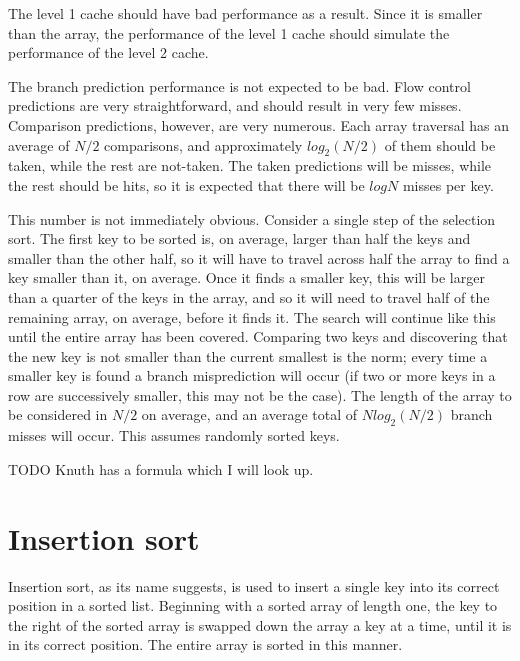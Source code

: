 The level 1 cache should have bad performance as a result. Since it is smaller
than the array, the performance of the level 1 cache should simulate the
performance of the level 2 cache.

\label{selection branches logn}
The branch prediction performance is not expected to be bad. Flow control
predictions are very straightforward, and should result in very few misses.
Comparison predictions, however, are very numerous. Each array traversal has an
average of $N/2$ comparisons, and approximately $log_2(N/2)$ of them should be
taken, while the rest are not-taken. The taken predictions will be misses,
while the rest should be hits, so it is expected that there will be $logN$
misses per key.

This number is not immediately obvious. Consider a single step of the selection
sort. The first key to be sorted is, on average, larger than half the keys and
smaller than the other half, so it will have to travel across half the array to
find a key smaller than it, on average. Once it finds a smaller key, this will
be larger than a quarter of the keys in the array, and so it will need to travel
half of the remaining array, on average, before it finds it. The search will
continue like this until the entire array has been covered. Comparing two keys
and discovering that the new key is not smaller than the current smallest is the
norm; every time a smaller key is found a branch misprediction will occur (if
two or more keys in a row are successively smaller, this may not be the case).
The length of the array to be considered in $N/2$ on average, and an average
total of $Nlog_2(N/2)$ branch misses will occur. This assumes randomly sorted
keys.

TODO Knuth has a formula which I will look up.

\section{Insertion sort}

Insertion sort, as its name suggests, is used to insert a single key into its
correct position in a sorted list. Beginning with a sorted array of length one,
the key to the right of the sorted array is swapped down the array a key at a
time, until it is in its correct position. The entire array is sorted in this
manner.

